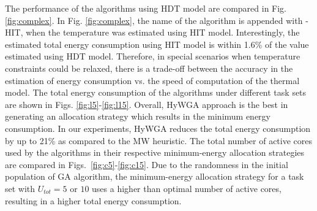 \documentclass[conference]{IEEEtran}
\begin{document}
%





The performance of the algorithms using HDT model are compared in Fig. \ref{fig:complex}.
In Fig. \ref{fig:complex}, the name of the algorithm is appended with -HIT, when the temperature was estimated using  HIT model.
Interestingly, the estimated total energy consumption using HIT model is  within 1.6\% of the value estimated using HDT model.
Therefore, in special scenarios when temperature constraints could be relaxed, there is a trade-off between the accuracy in the estimation of energy consumption vs. the speed of computation of the thermal model.
The total energy consumption of the algorithms under different task sets are shown in Figs. \ref{fig:l5}-\ref{fig:l15}.
Overall, HyWGA approach is the best in generating an allocation strategy which results in the minimum energy consumption.
In our experiments, HyWGA reduces the total energy consumption by up to 21\% as compared to the MW heuristic.
The total number of active cores used by the algorithms in their respective minimum-energy allocation strategies
are compared in Figs.~\ref{fig:c5}-\ref{fig:c15}.
Due to the randomness in the initial population of GA algorithm, the minimum-energy allocation strategy for a task set with $U_{tot}=5$ or $10$
uses a higher than optimal number of active cores, resulting in a higher total energy consumption. %
\end{document}
